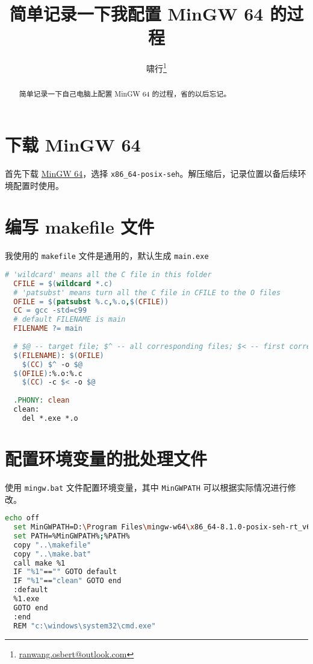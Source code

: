 \documentclass{ctexart}
\title{简单记录一下我配置 MinGW 64 的过程}
\author{啸行\thanks{\url{ranwang.osbert@outlook.com}}}
\begin{document}
  
\maketitle

\begin{abstract}
  简单记录一下自己电脑上配置 MinGW 64 的过程，省的以后忘记。
\end{abstract}

\section{下载 MinGW 64}

首先下载 \href{https://sourceforge.net/projects/mingw-w64/files/mingw-w64/}{MinGW 64}，选择 \texttt{x86\_64-posix-seh}。解压缩后，记录位置以备后续环境配置时使用。

\section{编写 makefile 文件}

我使用的 \texttt{makefile} 文件是通用的，默认生成 \texttt{main.exe}

\begin{lstlisting}[language=make]
  # 'wildcard' means all the C file in this folder
  CFILE = $(wildcard *.c)
  # 'patsubst' means turn all the C file in CFILE to the O files
  OFILE = $(patsubst %.c,%.o,$(CFILE))
  CC = gcc -std=c99
  # default FILENAME is main
  FILENAME ?= main
  
  # $@ -- target file; $^ -- all corresponding files; $< -- first corresponding files
  $(FILENAME): $(OFILE)
  	$(CC) $^ -o $@
  $(OFILE):%.o:%.c
  	$(CC) -c $< -o $@
   
  .PHONY: clean
  clean:
  	del *.exe *.o
\end{lstlisting}

\section{配置环境变量的批处理文件}

使用 \texttt{mingw.bat} 文件配置环境变量，其中 \texttt{MinGWPATH} 可以根据实际情况进行修改。

\begin{lstlisting}[language = bash]
  echo off
  set MinGWPATH=D:\Program Files\mingw-w64\x86_64-8.1.0-posix-seh-rt_v6-rev0\mingw64\bin
  set PATH=%MinGWPATH%;%PATH%
  copy "..\makefile"
  copy "..\make.bat"
  call make %1
  IF "%1"=="" GOTO default
  IF "%1"=="clean" GOTO end
  :default
  %1.exe
  GOTO end
  :end
  REM "c:\windows\system32\cmd.exe"
\end{lstlisting}
\end{document}
